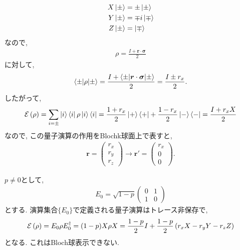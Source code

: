 \begin{ex}
    \label{ex8.15}
    \begin{align*}
        X \ket{\pm} & = \pm \ket{\pm}  \\
        Y \ket{\pm} & = \mp i\ket{\mp} \\
        Z \ket{\pm} & = \ket{\mp}
    \end{align*}
    なので,
    \begin{align*}
        \rho = \frac{I + \bm{r} \cdot \bm{\sigma}}{2}
    \end{align*}
    に対して,
    \begin{align*}
        \braket{\pm | \rho | \pm}
        =
        \frac{I + \braket{ \pm| \bm{r} \cdot \bm{\sigma} |\pm}}{2}
        =
        \frac{I \pm r_x}{2}.
    \end{align*}
    したがって,
    \begin{align*}
        \mathcal{E}\left( \rho \right)
        =
        \sum_{i = \pm} \ket{i}\bra{i} \rho \ket{i}\bra{i}
        =
        \frac{1 + r_x}{2} \ket{+}\bra{+} + \frac{1 - r_x}{2} \ket{-}\bra{-}
        =
        \frac{I + r_x X}{2}
    \end{align*}
    なので, この量子演算の作用をBlochk球面上で表すと,
    \begin{align*}
        \bm{r} =
        \begin{pmatrix}
            r_x \\
            r_y \\
            r_z
        \end{pmatrix}
        \longrightarrow
        \bm{r}' =
        \begin{pmatrix}
            r_x \\
            0   \\
            0
        \end{pmatrix}.
    \end{align*}
\end{ex}

\begin{ex}
    \label{ex8.16}
    $p\neq 0$として,
    \begin{align*}
        E_0 =
        \sqrt{1-p}
        \begin{pmatrix}
            0 & 1 \\
            1 & 0
        \end{pmatrix}
    \end{align*}
    とする. 演算集合$\{ E_0 \}$で定義される量子演算はトレース非保存で,
    \begin{align*}
        \mathcal{E} \left( \rho\right)
        =
        E_0 \rho E_0^\dagger
        =
        (1-p)X \rho X
        =
        \frac{1-p}{2} I
        +
        \frac{1-p}{2}
        \left( r_x X - r_y Y - r_z Z\right)
    \end{align*}
    となる. これはBloch球表示できない.
\end{ex}

